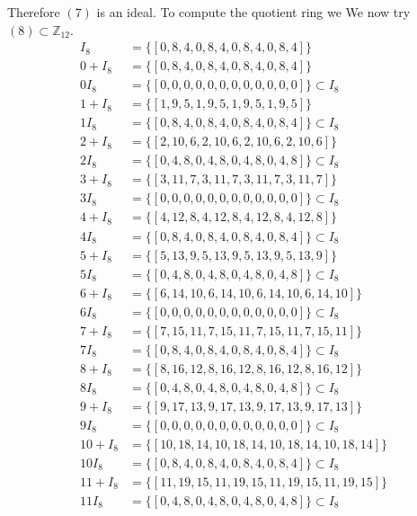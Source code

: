 \documentclass[11pt]{amsart}
\begin{document}
Therefore $(7)$ is an ideal.
To compute the quotient ring we
We now try $(8) \subset \mathbb{Z}_{12}$.
\begin{equation*}
\begin{aligned}
I_8 &= \{[0, 8, 4, 0, 8, 4, 0, 8, 4, 0, 8, 4]\} \\
0+ I_8 &= \{[0, 8, 4, 0, 8, 4, 0, 8, 4, 0, 8, 4]\}\\
0 I_8 &= \{[0, 0, 0, 0, 0, 0, 0, 0, 0, 0, 0, 0]\} \subset I_8 \\
1+ I_8 &= \{[1, 9, 5, 1, 9, 5, 1, 9, 5, 1, 9, 5]\}\\
1 I_8 &= \{[0, 8, 4, 0, 8, 4, 0, 8, 4, 0, 8, 4]\} \subset I_8 \\
2+ I_8 &= \{[2, 10, 6, 2, 10, 6, 2, 10, 6, 2, 10, 6]\}\\
2 I_8 &= \{[0, 4, 8, 0, 4, 8, 0, 4, 8, 0, 4, 8]\} \subset I_8 \\
3+ I_8 &= \{[3, 11, 7, 3, 11, 7, 3, 11, 7, 3, 11, 7]\}\\
3 I_8 &= \{[0, 0, 0, 0, 0, 0, 0, 0, 0, 0, 0, 0]\} \subset I_8 \\
4+ I_8 &= \{[4, 12, 8, 4, 12, 8, 4, 12, 8, 4, 12, 8]\}\\
4 I_8 &= \{[0, 8, 4, 0, 8, 4, 0, 8, 4, 0, 8, 4]\} \subset I_8 \\
5+ I_8 &= \{[5, 13, 9, 5, 13, 9, 5, 13, 9, 5, 13, 9]\}\\
5 I_8 &= \{[0, 4, 8, 0, 4, 8, 0, 4, 8, 0, 4, 8]\} \subset I_8 \\
6+ I_8 &= \{[6, 14, 10, 6, 14, 10, 6, 14, 10, 6, 14, 10]\}\\
6 I_8 &= \{[0, 0, 0, 0, 0, 0, 0, 0, 0, 0, 0, 0]\} \subset I_8 \\
7+ I_8 &= \{[7, 15, 11, 7, 15, 11, 7, 15, 11, 7, 15, 11]\}\\
7 I_8 &= \{[0, 8, 4, 0, 8, 4, 0, 8, 4, 0, 8, 4]\} \subset I_8 \\
8+ I_8 &= \{[8, 16, 12, 8, 16, 12, 8, 16, 12, 8, 16, 12]\}\\
8 I_8 &= \{[0, 4, 8, 0, 4, 8, 0, 4, 8, 0, 4, 8]\} \subset I_8 \\
9+ I_8 &= \{[9, 17, 13, 9, 17, 13, 9, 17, 13, 9, 17, 13]\}\\
9 I_8 &= \{[0, 0, 0, 0, 0, 0, 0, 0, 0, 0, 0, 0]\} \subset I_8 \\
10+ I_8 &= \{[10, 18, 14, 10, 18, 14, 10, 18, 14, 10, 18, 14]\}\\
10 I_8 &= \{[0, 8, 4, 0, 8, 4, 0, 8, 4, 0, 8, 4]\} \subset I_8 \\
11+ I_8 &= \{[11, 19, 15, 11, 19, 15, 11, 19, 15, 11, 19, 15]\}\\
11 I_8 &= \{[0, 4, 8, 0, 4, 8, 0, 4, 8, 0, 4, 8]\} \subset I_8 \\
\end{aligned}
\end{equation*}
\end{document}
